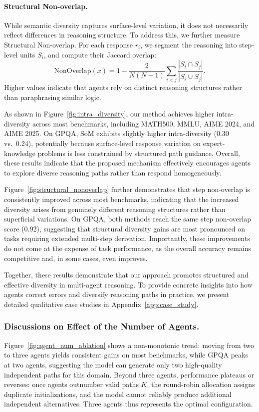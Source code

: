 \paragraph{Structural Non-overlap.}
While semantic diversity captures surface-level variation, it does not necessarily reflect differences in reasoning structure. To address this, we further measure Structural Non-overlap. For each response $r_i$, we segment the reasoning into step-level units $S_i$, and compute their Jaccard overlap:
\begin{equation}
\mathrm{NonOverlap}(x) = 1 - \frac{2}{N(N-1)} \sum_{i<j} \frac{|S_i \cap S_j|}{|S_i \cup S_j|}.
\end{equation}
Higher values indicate that agents rely on distinct reasoning structures rather than paraphrasing similar logic.

As shown in Figure~\ref{fig:intra_diversity}, our method achieves higher intra-diversity across most benchmarks, including MATH500, MMLU, AIME 2024, and AIME 2025. On GPQA, SoM exhibits slightly higher intra-diversity (0.30 vs.\ 0.24), potentially because surface-level response variation on expert-knowledge problems is less constrained by structured path guidance. Overall, these results indicate that the proposed mechanism effectively encourages agents to explore diverse reasoning paths rather than respond homogeneously.

Figure~\ref{fig:structural_nonoverlap} further demonstrates that step non-overlap is consistently improved across most benchmarks, indicating that the increased diversity arises from genuinely different reasoning structures rather than superficial variations. On GPQA, both methods reach the same step non-overlap score (0.92), suggesting that structural diversity gains are most pronounced on tasks requiring extended multi-step derivation. Importantly, these improvements do not come at the expense of task performance, as the overall accuracy remains competitive and, in some cases, even improves.

Together, these results demonstrate that our approach promotes structured and effective diversity in multi-agent reasoning.
To provide concrete insights into how agents correct errors and diversify reasoning paths in practice, we present detailed qualitative case studies in Appendix~\ref{app:case_study}.


\subsubsection{Discussions on Effect of the Number of Agents.}
Figure~\ref{fig:agent_num_ablation} shows a non-monotonic trend: moving from two to three agents yields consistent gains on most benchmarks, while GPQA peaks at two agents, suggesting the model can generate only two high-quality independent paths for this domain. Beyond three agents, performance plateaus or reverses: once agents outnumber valid paths $K$, the round-robin allocation assigns duplicate initializations, and the model cannot reliably produce additional independent alternatives. Three agents thus represents the optimal configuration.


